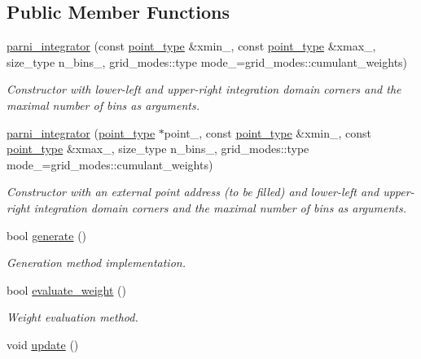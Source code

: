 \subsection*{Public Member Functions}
\begin{DoxyCompactItemize}
\item 
\hyperlink{a00395_adf939625bbca4ef9d79d3e12b79369d1}{parni\+\_\+integrator} (const \hyperlink{a00579}{point\+\_\+type} \&xmin\+\_\+, const \hyperlink{a00579}{point\+\_\+type} \&xmax\+\_\+, size\+\_\+type n\+\_\+bins\+\_, grid\+\_\+modes\+::type mode\+\_\+=grid\+\_\+modes\+::cumulant\+\_\+weights)
\begin{DoxyCompactList}\small\item\em Constructor with lower-\/left and upper-\/right integration domain corners and the maximal number of bins as arguments. \end{DoxyCompactList}\item 
\hyperlink{a00395_a0ffffabca9adcd4d297ebff69ca8cc2b}{parni\+\_\+integrator} (\hyperlink{a00579}{point\+\_\+type} $\ast$point\+\_\+, const \hyperlink{a00579}{point\+\_\+type} \&xmin\+\_\+, const \hyperlink{a00579}{point\+\_\+type} \&xmax\+\_\+, size\+\_\+type n\+\_\+bins\+\_, grid\+\_\+modes\+::type mode\+\_\+=grid\+\_\+modes\+::cumulant\+\_\+weights)
\begin{DoxyCompactList}\small\item\em Constructor with an external point address (to be filled) and lower-\/left and upper-\/right integration domain corners and the maximal number of bins as arguments. \end{DoxyCompactList}\item 
\hypertarget{a00395_a2f50fc4c21724fbe2f6d3b5579cb5f3f}{}bool \hyperlink{a00395_a2f50fc4c21724fbe2f6d3b5579cb5f3f}{generate} ()\label{a00395_a2f50fc4c21724fbe2f6d3b5579cb5f3f}

\begin{DoxyCompactList}\small\item\em Generation method implementation. \end{DoxyCompactList}\item 
\hypertarget{a00395_a672ad11bb803db868f62aba828b39aca}{}bool \hyperlink{a00395_a672ad11bb803db868f62aba828b39aca}{evaluate\+\_\+weight} ()\label{a00395_a672ad11bb803db868f62aba828b39aca}

\begin{DoxyCompactList}\small\item\em Weight evaluation method. \end{DoxyCompactList}\item 
\hypertarget{a00395_a62adcda41cf5916f1f8b85f385e2dc1f}{}void \hyperlink{a00395_a62adcda41cf5916f1f8b85f385e2dc1f}{update} ()\label{a00395_a62adcda41cf5916f1f8b85f385e2dc1f}


\end{DoxyCompactItemize}
